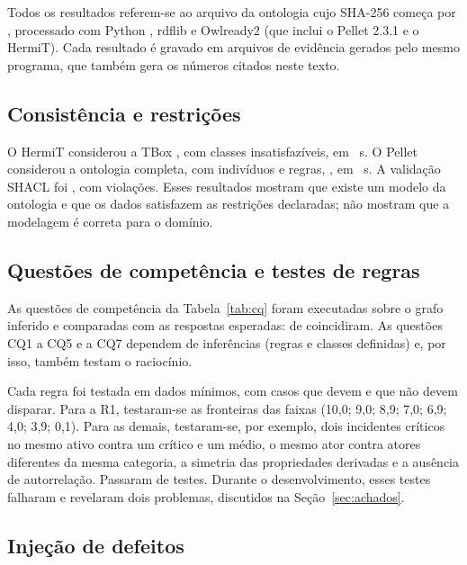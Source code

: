 \documentclass[12pt]{article}
\begin{document}
Todos os resultados referem-se ao arquivo da ontologia cujo SHA-256 começa por \texttt{\vSevenHash}, processado com Python \envPython{}, rdflib \envRdflib{} e Owlready2 \envOwlready{} (que inclui o Pellet 2.3.1 e o HermiT). Cada resultado é gravado em arquivos de evidência gerados pelo mesmo programa, que também gera os números citados neste texto.

\subsection{Consistência e restrições}

O HermiT considerou a TBox \hermitOK{}, com \hermitUnsat{} classes insatisfazíveis, em \hermitSec{}~s. O Pellet considerou a ontologia completa, com indivíduos e regras, \pelletOK{}, em \pelletSec{}~s. A validação SHACL foi \shaclOK{}, com \shaclViol{} violações. Esses resultados mostram que existe um modelo da ontologia e que os dados satisfazem as restrições declaradas; não mostram que a modelagem é correta para o domínio.

\subsection{Questões de competência e testes de regras}

As \cqTotal{} questões de competência da Tabela~\ref{tab:cq} foram executadas sobre o grafo inferido e comparadas com as respostas esperadas: \cqPassed{} de \cqTotal{} coincidiram. As questões CQ1 a CQ5 e a CQ7 dependem de inferências (regras e classes definidas) e, por isso, também testam o raciocínio.

Cada regra foi testada em dados mínimos, com casos que devem e que não devem disparar. Para a R1, testaram-se as fronteiras das faixas (10,0; 9,0; 8,9; 7,0; 6,9; 4,0; 3,9; 0,1). Para as demais, testaram-se, por exemplo, dois incidentes críticos no mesmo ativo contra um crítico e um médio, o mesmo ator contra atores diferentes da mesma categoria, a simetria das propriedades derivadas e a ausência de autorrelação. Passaram \rtPassed{} de \rtTotal{} testes. Durante o desenvolvimento, esses testes falharam e revelaram dois problemas, discutidos na Seção~\ref{sec:achados}.

\subsection{Injeção de defeitos}
\end{document}

